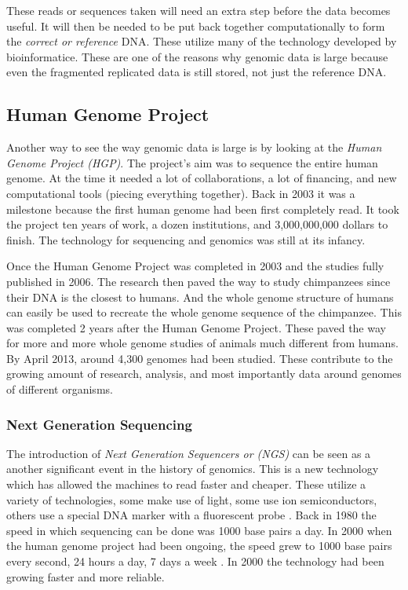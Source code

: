 \documentclass[acmsmall]{acmart}
\begin{document}
These reads or sequences taken will need an extra step before the data becomes useful. It will then be needed to be put back together computationally to form the \textit{correct or reference} DNA. These utilize many of the technology developed by bioinformatice. These are one of the reasons why genomic data is large because even the fragmented replicated data is still stored, not just the reference DNA.

\subsection{Human Genome Project}

Another way to see the way genomic data is large is by looking at the \textit{Human Genome Project (HGP)}. The project's aim was to sequence the entire human genome. At the time it needed a lot of collaborations, a lot of financing, and new computational tools (piecing everything together). Back in 2003 it was a milestone because the first human genome \cite{introgenomics} had been first completely read. It took the project ten years of work, a dozen institutions, and 3,000,000,000 dollars to finish. The technology for sequencing and genomics was still at its infancy. 

Once the Human Genome Project was completed in 2003 and the studies fully published in 2006. The research then paved the way to study chimpanzees since their DNA is the closest to humans. And the whole genome structure of humans can easily be used to recreate the whole genome sequence of the chimpanzee. This was completed 2 years after the Human Genome Project\cite{campbell}. These paved the way for more and more whole genome studies of animals much different from humans. By April 2013, around 4,300 genomes had been studied\cite{campbell}. These contribute to the growing amount of research, analysis, and most importantly data around genomes of different organisms.


\subsubsection{Next Generation Sequencing}

The introduction of \textit{Next Generation Sequencers or (NGS)} can be seen as a another significant event in the history of genomics. This is a new technology which has allowed the machines to read faster and cheaper. These utilize a variety of technologies, some make use of light, some use ion semiconductors, others use a special DNA marker with a fluorescent probe \cite[~p.67]{paulselzer2018}.  Back in 1980 the speed in which sequencing can be done was 1000 base pairs a day. In 2000 when the human genome project had been ongoing, the speed grew to 1000 base pairs every second, 24 hours a day, 7 days a week \cite{campbell}.  In 2000 the technology had been growing faster and more reliable.
\end{document}
